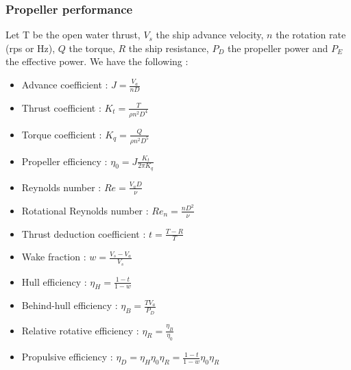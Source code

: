 \documentclass[../main.tex]{subfiles}
\begin{document}
\subsubsection{Propeller performance}
Let T be the open water thrust, $V_s$ the ship advance velocity, $n$ the rotation rate (rps or Hz), $Q$ the torque, $R$ the ship resistance, $P_D$ the propeller power and $P_E$ the effective power. We have the following : \begin{itemize}
\item Advance coefficient : $J = \frac{V_a}{nD}$
\item Thrust coefficient : $K_t = \frac{T}{\rho n^2 D^4}$
\item Torque coefficient : $K_q = \frac{Q}{\rho n^2 D^5}$
\item Propeller efficiency : $\eta_0 = J \frac{K_t}{2\pi K_q}$
\item Reynolds number : $Re = \frac{V_a D}{\nu}$
\item Rotational Reynolds number : $Re_n = \frac{nD^2}{\nu}$
    \item Thrust deduction coefficient : $t = \frac{T-R}{T}$
    \item Wake fraction : $w = \frac{V_s - V_a}{V_s}$
    \item Hull efficiency : $\eta_H = \frac{1-t}{1-w}$
    \item Behind-hull efficiency : $\eta_B = \frac{TV_a}{P_D}$
    \item Relative rotative efficiency : $\eta_R = \frac{\eta_B}{\eta_0}$
    \item Propulsive efficiency : $\eta_D = \eta_H \eta_0 \eta_R = \frac{1-t}{1-w} \eta_0 \eta_R$
\end{itemize}
\end{document}
